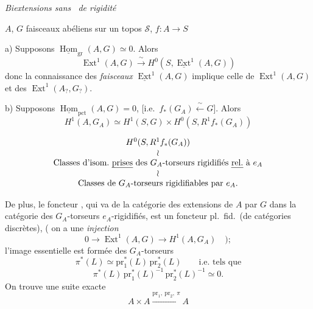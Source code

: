 \documentclass[11pt,a4paper]{article}
\begin{document}

\emph{Biextensions sans \ de rigidité}

$A$, $G$ faisceaux abéliens sur un topos $\mathcal{S}$, $f\colon A \to S$ \ill{}

a) Supposons $\underline{\operatorname{Hom}}_{\mathrm{gr}}(A, G) \simeq 0$. Alors
\[
\operatorname{Ext}^1(A, G) \xrightarrow{\ \sim\ } H^0(S,
\underline{\operatorname{Ext}}^1(A, G))
\]
donc la connaissance des \emph{faisceaux} $\underline{\operatorname{Ext}}^1(A, G)$
implique celle de $\operatorname{Ext}^1(A, G)$ et  des
$\operatorname{Ext}^1(A_{?}, G_{?})$.

b) Supposons $\underline{\operatorname{Hom}}_{\mathrm{pct}}(A, G) = 0$,
[i.e.\ $f_*(G_A) \xleftarrow{\ \sim\ } G$]. Alors
\[
H^1(A, G_A) \simeq H^1(S, G) \times H^0(S, R^1f_*(G_A))
\]

\[
\begin{array}{c}
H^0(S, R^1f_*(G_A)) \\
\wr \\
\text{Classes d'isom.\ \uncertain{prises} des } G_A\text{-torseurs rigidifiés
\uncertain{rel.}\ à } e_A \\
\wr \\
\text{Classes de } G_A\text{-torseurs rigidifiables par } e_A.
\end{array}
\]

De plus, le foncteur , qui va de la catégorie des extensions
de $A$ par $G$ dans la catégorie des $G_A$-torseurs $e_A$-rigidifiés, est un
foncteur pl.\ fid.\ (de catégories discrètes), (\struck{\ill{}} on a une
\emph{injection}
\[
0 \longrightarrow \operatorname{Ext}^1(A, G) \longrightarrow H^1(A, G_A) \quad );
\]
l'image essentielle est formée des \struck{\ill{}} $G_A$-torseurs
\[
\pi^*(L) \simeq \mathrm{pr}_1^*(L)\, \mathrm{pr}_2^*(L) \qquad \text{i.e.\ tels
que}
\]
\[
\pi^*(L)\, \mathrm{pr}_1^*(L)^{-1}\, \mathrm{pr}_2^*(L)^{-1} \simeq 0 .
\]
On trouve \ill{} \ill{} \ill{}  une suite exacte
\[
A \times A \overset{\mathrm{pr}_1,\ \mathrm{pr}_2,\ \pi}{\longrightarrow} A
\]
\end{document}
